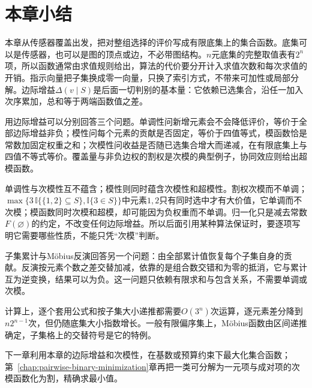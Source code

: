 \FloatBarrier
\section{本章小结}
\label{sec:set-functions-chapter-summary}

本章从传感器覆盖出发，把对整组选择的评价写成有限底集上的集合函数。底集可以是传感器，也可以是图的顶点或边，不必带图结构。$n$元底集的完整取值表有$2^n$项，所以函数通常由求值规则给出，算法的代价要分开计入求值次数和每次求值的开销。指示向量把子集换成零一向量，只换了索引方式，不带来可加性或局部分解。边际增益$\Delta(v\mid S)$是后面一切判别的基本量：它依赖已选集合，沿任一加入次序累加，总和等于两端函数值之差。

用边际增益可以分别回答三个问题。单调性问新增元素会不会降低评价，等价于全部边际增益非负；模性问每个元素的贡献是否固定，等价于四值等式，模函数恰是常数加固定权重之和；次模性问收益是否随已选集合增大而递减，在有限底集上与四值不等式等价。覆盖量与非负边权的割权是次模的典型例子，协同效应则给出超模函数。

单调性与次模性互不蕴含；模性则同时蕴含次模性和超模性。割权次模而不单调；$\max\{3\,\mathbb I\{\{1,2\}\subseteq S\},\mathbb I\{3\in S\}\}$中元素$1,2$只有同时选中才有大价值，它单调而不次模；模函数同时次模和超模，却可能因为负权重而不单调。归一化只是减去常数$F(\varnothing)$的约定，不改变任何边际增益。所以后面引用某种算法保证时，要逐项写明它需要哪些性质，不能只凭“次模”判断。

子集累计与Möbius反演回答另一个问题：由全部累计值恢复每个子集自身的贡献。反演按元素个数之差交替加减，依靠的是组合数交错和为零的抵消，它与累计互为逆变换，结果可以为负。这一问题只依赖有限求和与包含关系，不需要单调或次模。

计算上，逐个套用公式和按子集大小递推都需要$O(3^n)$次运算，逐元素差分降到$n2^{n-1}$次，但仍随底集大小指数增长。一般有限偏序集上，Möbius函数由区间递推确定，子集格上的交替符号是它的特例。

下一章利用本章的边际增益和次模性，在基数或预算约束下最大化集合函数；第~\ref{chap:pairwise-binary-minimization}章再把一类可分解为一元项与成对项的次模函数化为割，精确求最小值。
